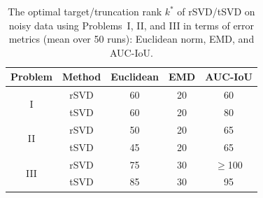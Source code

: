 \begin{table}[H]
    \centering
    \begin{tabular}{cc ccc}
    \toprule
    Problem & Method & Euclidean & EMD & AUC-IoU \\
    \midrule
    \multirow{2}{*}{I}
    & rSVD & 60 & 20 & 60 \\
    & tSVD & 60 & 20 & 80 \\
    
    \midrule
    \multirow{2}{*}{II}
    & rSVD & 50 & 20 & 65 \\
    & tSVD & 45 & 20 & 65 \\

    \midrule
    \multirow{2}{*}{III}
    & rSVD & 75 & 30 & $\ge$100 \\
    & tSVD & 85 & 30 & 95 \\
    \bottomrule
    \end{tabular}
    
\caption{The optimal target/truncation rank $k^*$ of rSVD/tSVD on noisy data using Problems~I, II, and III in terms of error metrics (mean over 50 runs): Euclidean norm, EMD, and AUC-IoU.}
\label{tab:noisy}
\end{table}